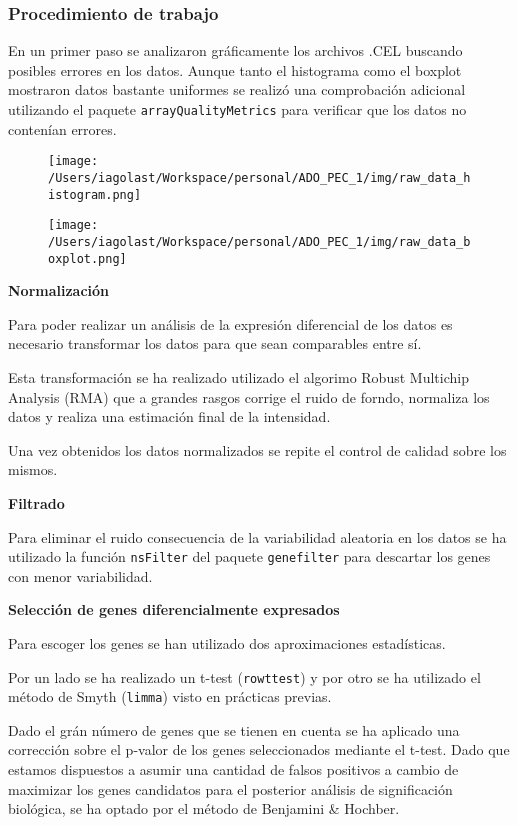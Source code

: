 \documentclass[
]{article}
\begin{document}
\hypertarget{header-n1214}{%
\subsubsection{Procedimiento de trabajo}\label{header-n1214}}

En un primer paso se analizaron gráficamente los archivos .CEL buscando
posibles errores en los datos. Aunque tanto el histograma como el
boxplot mostraron datos bastante uniformes se realizó una comprobación
adicional utilizando el paquete \texttt{arrayQualityMetrics} para
verificar que los datos no contenían errores.

\begin{figure}
\centering
\texttt{[image: /Users/iagolast/Workspace/personal/ADO\_PEC\_1/img/raw\_data\_histogram.png]}
\caption{}
\end{figure}

\begin{figure}
\centering
\texttt{[image: /Users/iagolast/Workspace/personal/ADO\_PEC\_1/img/raw\_data\_boxplot.png]}
\caption{}
\end{figure}

\textbf{Normalización}

Para poder realizar un análisis de la expresión diferencial de los datos
es necesario transformar los datos para que sean comparables entre sí.

Esta transformación se ha realizado utilizado el algorimo Robust
Multichip Analysis (RMA) que a grandes rasgos corrige el ruido de
forndo, normaliza los datos y realiza una estimación final de la
intensidad.

Una vez obtenidos los datos normalizados se repite el control de calidad
sobre los mismos.

\textbf{Filtrado}

Para eliminar el ruido consecuencia de la variabilidad aleatoria en los
datos se ha utilizado la función \texttt{nsFilter} del paquete
\texttt{genefilter} para descartar los genes con menor variabilidad.

\textbf{Selección de genes diferencialmente expresados}

Para escoger los genes se han utilizado dos aproximaciones estadísticas.

Por un lado se ha realizado un t-test (\texttt{rowttest}) y por otro se
ha utilizado el método de Smyth (\texttt{limma}) visto en prácticas
previas.

Dado el grán número de genes que se tienen en cuenta se ha aplicado una
corrección sobre el p-valor de los genes seleccionados mediante el
t-test. Dado que estamos dispuestos a asumir una cantidad de falsos
positivos a cambio de maximizar los genes candidatos para el posterior
análisis de significación biológica, se ha optado por el método de
Benjamini \& Hochber.
\end{document}
